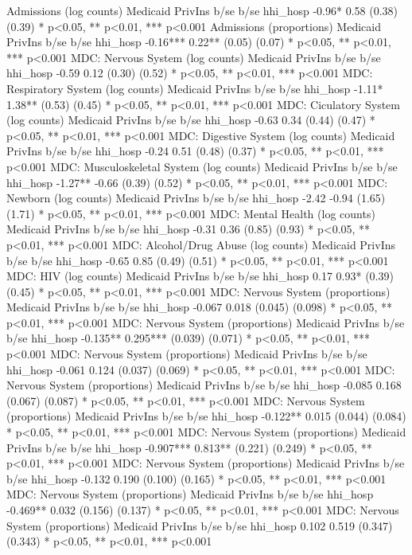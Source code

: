 Admissions (log counts)
	Medicaid	PrivIns
	b/se	b/se
hhi_hosp	-0.96*	0.58
	(0.38)	(0.39)
* p<0.05, ** p<0.01, *** p<0.001
Admissions (proportions)
	Medicaid	PrivIns
	b/se	b/se
hhi_hosp	-0.16***	0.22**
	(0.05)	(0.07)
* p<0.05, ** p<0.01, *** p<0.001
MDC: Nervous System (log counts)
	Medicaid	PrivIns
	b/se	b/se
hhi_hosp	-0.59	0.12
	(0.30)	(0.52)
* p<0.05, ** p<0.01, *** p<0.001
MDC: Respiratory System (log counts)
	Medicaid	PrivIns
	b/se	b/se
hhi_hosp	-1.11*	1.38**
	(0.53)	(0.45)
* p<0.05, ** p<0.01, *** p<0.001
MDC: Ciculatory System (log counts)
	Medicaid	PrivIns
	b/se	b/se
hhi_hosp	-0.63	0.34
	(0.44)	(0.47)
* p<0.05, ** p<0.01, *** p<0.001
MDC: Digestive System (log counts)
	Medicaid	PrivIns
	b/se	b/se
hhi_hosp	-0.24	0.51
	(0.48)	(0.37)
* p<0.05, ** p<0.01, *** p<0.001
MDC: Musculoskeletal System (log counts)
	Medicaid	PrivIns
	b/se	b/se
hhi_hosp	-1.27**	-0.66
	(0.39)	(0.52)
* p<0.05, ** p<0.01, *** p<0.001
MDC: Newborn (log counts)
	Medicaid	PrivIns
	b/se	b/se
hhi_hosp	-2.42	-0.94
	(1.65)	(1.71)
* p<0.05, ** p<0.01, *** p<0.001
MDC: Mental Health (log counts)
	Medicaid	PrivIns
	b/se	b/se
hhi_hosp	-0.31	0.36
	(0.85)	(0.93)
* p<0.05, ** p<0.01, *** p<0.001
MDC: Alcohol/Drug Abuse (log counts)
	Medicaid	PrivIns
	b/se	b/se
hhi_hosp	-0.65	0.85
	(0.49)	(0.51)
* p<0.05, ** p<0.01, *** p<0.001
MDC: HIV (log counts)
	Medicaid	PrivIns
	b/se	b/se
hhi_hosp	0.17	0.93*
	(0.39)	(0.45)
* p<0.05, ** p<0.01, *** p<0.001
MDC: Nervous System (proportions)
	Medicaid	PrivIns
	b/se	b/se
hhi_hosp	-0.067	0.018
	(0.045)	(0.098)
* p<0.05, ** p<0.01, *** p<0.001
MDC: Nervous System (proportions)
	Medicaid	PrivIns
	b/se	b/se
hhi_hosp	-0.135**	0.295***
	(0.039)	(0.071)
* p<0.05, ** p<0.01, *** p<0.001
MDC: Nervous System (proportions)
	Medicaid	PrivIns
	b/se	b/se
hhi_hosp	-0.061	0.124
	(0.037)	(0.069)
* p<0.05, ** p<0.01, *** p<0.001
MDC: Nervous System (proportions)
	Medicaid	PrivIns
	b/se	b/se
hhi_hosp	-0.085	0.168
	(0.067)	(0.087)
* p<0.05, ** p<0.01, *** p<0.001
MDC: Nervous System (proportions)
	Medicaid	PrivIns
	b/se	b/se
hhi_hosp	-0.122**	0.015
	(0.044)	(0.084)
* p<0.05, ** p<0.01, *** p<0.001
MDC: Nervous System (proportions)
	Medicaid	PrivIns
	b/se	b/se
hhi_hosp	-0.907***	0.813**
	(0.221)	(0.249)
* p<0.05, ** p<0.01, *** p<0.001
MDC: Nervous System (proportions)
	Medicaid	PrivIns
	b/se	b/se
hhi_hosp	-0.132	0.190
	(0.100)	(0.165)
* p<0.05, ** p<0.01, *** p<0.001
MDC: Nervous System (proportions)
	Medicaid	PrivIns
	b/se	b/se
hhi_hosp	-0.469**	0.032
	(0.156)	(0.137)
* p<0.05, ** p<0.01, *** p<0.001
MDC: Nervous System (proportions)
	Medicaid	PrivIns
	b/se	b/se
hhi_hosp	0.102	0.519
	(0.347)	(0.343)
* p<0.05, ** p<0.01, *** p<0.001
